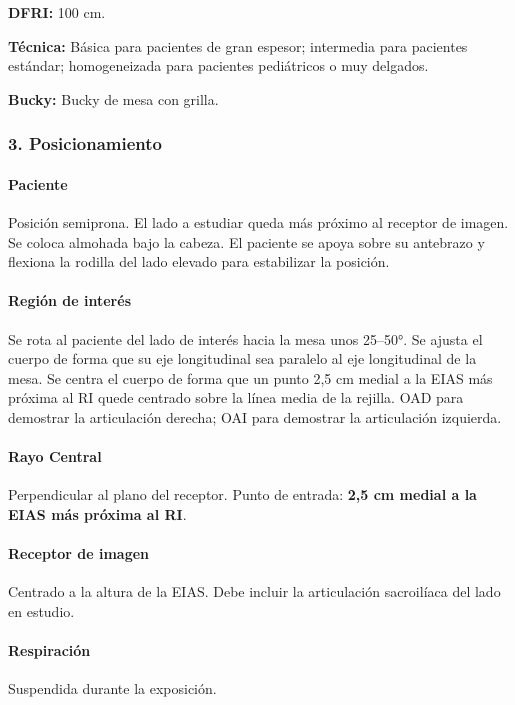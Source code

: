 		\textbf{DFRI:} 100 cm.
		
		\textbf{Técnica:} Básica para pacientes de gran espesor; intermedia para pacientes estándar; homogeneizada para pacientes pediátricos o muy delgados.
		
		\textbf{Bucky:} Bucky de mesa con grilla.
		
		\subsubsection*{3. Posicionamiento}
		
		\paragraph{Paciente}
		Posición semiprona. El lado a estudiar queda más próximo al receptor de imagen. Se coloca almohada bajo la cabeza. El paciente se apoya sobre su antebrazo y flexiona la rodilla del lado elevado para estabilizar la posición.
		
		\paragraph{Región de interés}
		Se rota al paciente del lado de interés hacia la mesa unos 25--50°. Se ajusta el cuerpo de forma que su eje longitudinal sea paralelo al eje longitudinal de la mesa. Se centra el cuerpo de forma que un punto 2,5 cm medial a la EIAS más próxima al RI quede centrado sobre la línea media de la rejilla. OAD para demostrar la articulación derecha; OAI para demostrar la articulación izquierda.
		
		\paragraph{Rayo Central}
		Perpendicular al plano del receptor. Punto de entrada: \textbf{2,5 cm medial a la EIAS más próxima al RI}.

		
		\paragraph{Receptor de imagen}
		Centrado a la altura de la EIAS. Debe incluir la articulación sacroilíaca del lado en estudio.
		
		\paragraph{Respiración}
		Suspendida durante la exposición.
		
